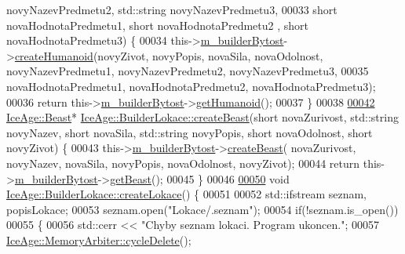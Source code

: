 \begin{DoxyCode}
      novyNazevPredmetu2, std::string novyNazevPredmetu3,
00033                                                      \textcolor{keywordtype}{short} novaHodnotaPredmetu1, \textcolor{keywordtype}{short} novaHodnotaPredmetu2
      , \textcolor{keywordtype}{short} novaHodnotaPredmetu3) \{
00034     this->\hyperlink{classIceAge_1_1BuilderLokace_ac6981c43c22713d56e7ccbefa8b5c8b4}{m\_builderBytost}->\hyperlink{classIceAge_1_1BuilderBytost_ad0ec5281ef8ba796b945845913802b32}{createHumanoid}(novyZivot, novyPopis, novaSila, 
      novaOdolnost, novyNazevPredmetu1, novyNazevPredmetu2, novyNazevPredmetu3,
00035                                              novaHodnotaPredmetu1, novaHodnotaPredmetu2, 
      novaHodnotaPredmetu3);
00036     \textcolor{keywordflow}{return} this->\hyperlink{classIceAge_1_1BuilderLokace_ac6981c43c22713d56e7ccbefa8b5c8b4}{m\_builderBytost}->\hyperlink{classIceAge_1_1BuilderBytost_a41d069e42ccad24d1af34e3e30945e25}{getHumanoid}();
00037 \}
00038 
\hypertarget{BuilderLokace_8cpp_source.tex_l00042}{}\hyperlink{classIceAge_1_1BuilderLokace_a6ce9f158876a0601a3bac0cc26ed2d46}{00042} \hyperlink{classIceAge_1_1Beast}{IceAge::Beast}* \hyperlink{classIceAge_1_1BuilderLokace_a6ce9f158876a0601a3bac0cc26ed2d46}{IceAge::BuilderLokace::createBeast}(\textcolor{keywordtype}{short} 
      novaZurivost, std::string novyNazev, \textcolor{keywordtype}{short} novaSila, std::string novyPopis, \textcolor{keywordtype}{short} novaOdolnost, \textcolor{keywordtype}{short} novyZivot)
       \{
00043     this->\hyperlink{classIceAge_1_1BuilderLokace_ac6981c43c22713d56e7ccbefa8b5c8b4}{m\_builderBytost}->\hyperlink{classIceAge_1_1BuilderBytost_a090e775261513f873b1aa85dcaca5efb}{createBeast}( novaZurivost, novyNazev, novaSila, 
      novyPopis, novaOdolnost, novyZivot);
00044     \textcolor{keywordflow}{return} this->\hyperlink{classIceAge_1_1BuilderLokace_ac6981c43c22713d56e7ccbefa8b5c8b4}{m\_builderBytost}->\hyperlink{classIceAge_1_1BuilderBytost_a0a5a5246a7b192effd4993bfcf4b23f3}{getBeast}();
00045 \}
00046 
\hypertarget{BuilderLokace_8cpp_source.tex_l00050}{}\hyperlink{classIceAge_1_1BuilderLokace_ac46d7d1ff685c51dbd382f65b29a6546}{00050} \textcolor{keywordtype}{void} \hyperlink{classIceAge_1_1BuilderLokace_ac46d7d1ff685c51dbd382f65b29a6546}{IceAge::BuilderLokace::createLokace}() \{
00051 
00052     std::ifstream seznam, popisLokace;
00053     seznam.open(\textcolor{stringliteral}{"Lokace/.seznam"});
00054     \textcolor{keywordflow}{if}(!seznam.is\_open())
00055     \{
00056         std::cerr << \textcolor{stringliteral}{"Chyby seznam lokaci. Program ukoncen."};
00057         \hyperlink{classIceAge_1_1MemoryArbiter_ae3460492678cf992629f4a70de3ef1ca}{IceAge::MemoryArbiter::cycleDelete}();

\end{DoxyCode}
